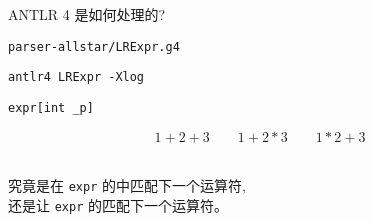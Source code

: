 
\begin{frame}{}
  \begin{center}
    \Large{ANTLR 4 是如何处理的?}
  \end{center}
\end{frame}

\begin{frame}{}
  \begin{center}
    \texttt{parser-allstar/LRExpr.g4}

    \vspace{0.30cm}

    \pause
    \vspace{0.80cm}
    \texttt{antlr4 LRExpr -Xlog}
  \end{center}
\end{frame}

\begin{frame}{}
  \begin{center}

  \pause
  \end{center}
\end{frame}

\begin{frame}{}

  \begin{center}
	\texttt{expr[int \_p]}
  \end{center}

\end{frame}

\begin{frame}{}
  \begin{center}
  \end{center}


  \[
    1 + 2 + 3 \qquad 1 + 2 \ast 3 \qquad 1 * 2 + 3
  \]
\end{frame}

\begin{frame}{}
  \begin{center}
     \\[10pt]
    究竟是在 \texttt{expr} 的中匹配下一个运算符, \\[15pt]
    还是让 \texttt{expr} 的匹配下一个运算符。
  \end{center}
\end{frame}

